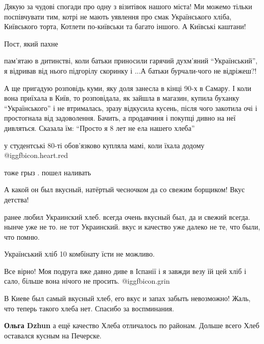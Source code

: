 \begin{itemize}

Дякую за чудові спогади про одну з візитівок нашого міста! Ми можемо тільки
поспівчувати тим, котрі не мають уявлення про смак Українського хліба,
Київського торта, Котлети по-київськи та багато іншого. А Київські каштани!


Пост, який пахне


пам'ятаю в дитинстві, коли батьки приносили гарячий духм'яний \enquote{Український}, я
відривав від нього підгорілу скоринку і ...А батьки бурчали-чого не відріжеш?!


А ще пригадую розповідь куми, яку доля занесла в кінці 90-х в Самару. І коли вона
приїхала в Київ, то розповідала, як зайшла в магазин, купила буханку
\enquote{Українського} і не втрималась, зразу відкусила кусень, після чого закотила очі і
простогнала від задоволення. Бачить, а продавчиня і покупці дивно на неї
дивляться. Сказала їм: \enquote{Просто я 8 лет не ела нашего хлеба}


у студентські 80-ті обов'язково купляла мамі, коли їхала додому @igg{fbicon.heart.red}

тоже грыз . пошел наливать

А какой он был вкусный, натёртый чесночком да со свежим борщиком! Вкус детства!


ранее любил Украинский хлеб. всегда очень вкусный был, да и свежий всегда.
нынче уже не то. не тот Украинский. вкус и качество уже далеко не те, что были,
что помню.

Український хліб 10 комбінату їсти не можливо.

Все вірно! Моя подруга вже давно диве в Іспанії і я завжди везу їй цей хліб і
сало, більше вона нічого не просить.  @igg{fbicon.grin} 


В Киеве был самый вкусный хлеб, его вкус и запах забыть невозможно! Жаль, что
теперь такого хлеба нет. Спасибо за воспминания.

\begin{itemize} %
\textbf{Ольга Dzhun} а ещё качество Хлеба отличалось по районам. Дольше всего Хлеб оставался кусным на Печерске.
\end{itemize} %


\end{itemize}
